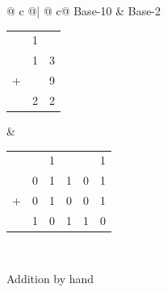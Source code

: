 \begin{figure}[!h]
    \begin{center}
        \begin{tabular}{@{\qquad} c @{\qquad}| @{\qquad} c@ {\qquad}}
            Base-10  & Base-2 \\
            \hline
            \begin{tabular}{ccc}
                & \tiny{1} & \\
                & 1 & 3 \\
                + &  & 9 \\
                \hline
                & 2 & 2 \\
            \end{tabular}
            & \begin{tabular}{cccccc}
                & & \tiny{1} & & & \tiny{1} \\
                & 0 & 1 & 1 & 0 & 1 \\
                + & 0 & 1 & 0 & 0 & 1 \\
                \hline
                & 1 & 0 & 1 & 1 & 0\\
            \end{tabular} \\
        \end{tabular}
    \end{center}
    \caption{Addition by hand}
    \label{fig::BaseAdditionComparison}
\end{figure}

